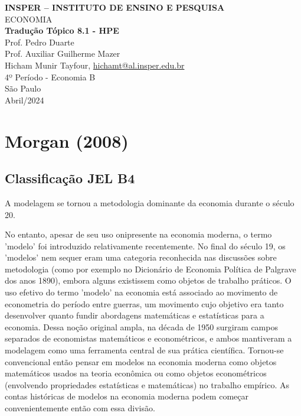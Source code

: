 \documentclass[a4paper,12pt]{article}[abntex2]
\begin{document}
\begin{titlepage}
    \centering
    \vspace*{1cm}
    \Large\textbf{INSPER – INSTITUTO DE ENSINO E PESQUISA}\\
    \Large ECONOMIA\\
    \vspace{1.5cm}
    \Large\textbf{Tradução Tópico 8.1 - HPE}\\
    \vspace{1.5cm}
    Prof. Pedro Duarte\\
    Prof. Auxiliar Guilherme Mazer\\
    \vfill
    \normalsize
    Hicham Munir Tayfour, \href{mailto:hichamt@al.insper.edu.br}{hichamt@al.insper.edu.br}\\
    4º Período - Economia B\\
    \vfill
    São Paulo\\
    Abril/2024
\end{titlepage}

\newpage
\tableofcontents
\thispagestyle{empty} %
\newpage
\setcounter{page}{1} %
\justify
\onehalfspacing

\pagestyle{fancy}
\fancyhf{}
\rhead{\thepage}

\section{\textbf{Morgan (2008)}}
\subsection{\textbf{Classificação JEL B4}}
A modelagem se tornou a metodologia dominante da economia durante o século 20.

No entanto, apesar de seu uso onipresente na economia moderna, o termo 'modelo' foi introduzido relativamente recentemente. No final do século 19, os 'modelos' nem sequer eram uma categoria reconhecida nas discussões sobre metodologia (como por exemplo no Dicionário de Economia Política de Palgrave dos anos 1890), embora alguns existissem como objetos de trabalho práticos. O uso efetivo do termo 'modelo' na economia está associado ao movimento de econometria do período entre guerras, um movimento cujo objetivo era tanto desenvolver quanto fundir abordagens matemáticas e estatísticas para a economia. Dessa noção original ampla, na década de 1950 surgiram campos separados de economistas matemáticos e econométricos, e ambos mantiveram a modelagem como uma ferramenta central de sua prática científica. Tornou-se convencional então pensar em modelos na economia moderna como objetos matemáticos usados na teoria econômica ou como objetos econométricos (envolvendo propriedades estatísticas e matemáticas) no trabalho empírico. As contas históricas de modelos na economia moderna podem começar convenientemente então com essa divisão.
\end{document}
